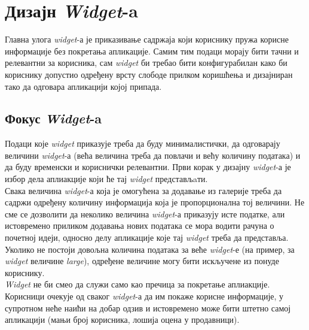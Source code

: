 \documentclass[12pt,oneside]{memoir}
\begin{document}
\section{Дизајн \textit{Widget}-a}
\label{sec:Дизајн Widget-a}

\indent Главна улога \textit{widget}-а је приказивање садржаја који кориснику пружа корисне информације без покретања апликације. Самим тим подаци морају бити тачни и релевантни за корисника, сам \textit{widget} би требао бити конфигурабилан како би кориснику допустио одређену врсту слободе прилком коришћења и дизајниран тако да одговара апликацији којој припада.

\subsection{Фокус \textit{Widget}-a}
\indent  Подаци које \textit{widget} приказује треба да буду минималистички, да одговарају величини \textit{widget}-а (већа величина треба да повлачи и већу количину података) и да буду временски и кориснички релевантни. Први корак у дизајну \textit{widget}-а је избор дела аплиакције који ће тај \textit{widget} представљaти. 
\\
\indent Свака величина \textit{widget}-а која је омогућена за додавање из галерије треба да садржи одређену количину информација која је пропорционална тој величини. Не сме се дозволити да неколико величина \textit{widget}-а приказују исте податке, али истовремено приликом додавања нових података се мора водити рачуна о почетној идеји, односно делу апликације које тај \textit{widget} треба да представља. Уколико не постоји довољна количина података за веће \textit{widget}-е (на пример, за \textit{widget} величине \textit{large}), одређене величине могу бити искључене из понуде кориснику.
\\
\indent \textit{Widget} не би смео да служи само као пречица за покретање аплиакције. Корисници очекује од сваког \textit{widget}-а да им покаже корисне информације, у супротном неће наићи на добар одзив и истовремено може бити штетно самој апликацији (мањи број корисника, лошија оцена у продавници).
\end{document}
